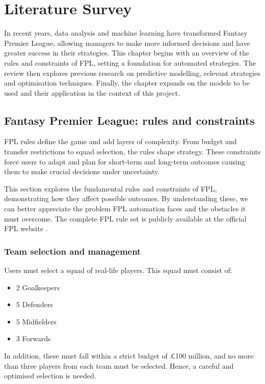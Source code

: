 \chapter{Literature Survey}

In recent years, data analysis and machine learning have transformed Fantasy Premier League, allowing managers to make more informed decisions and have greater success in their strategies.  This chapter begins with an overview of the rules and constraints of FPL, setting a foundation for automated strategies. The review then explores previous research on predictive modelling, relevant strategies and optimisation techniques. Finally, the chapter expands on the models to be used and their application in the context of this project.

\section{Fantasy Premier League: rules and constraints}

FPL rules define the game and add layers of complexity. From budget and transfer restrictions to squad selection, the rules shape strategy. These constraints force users to adapt and plan for short-term and long-term outcomes causing them to make crucial decisions under uncertainty.

This section explores the fundamental rules and constraints of FPL, demonstrating how they affect possible outcomes. By understanding these, we can better appreciate the problem FPL automation faces and the obstacles it must overcome. The complete FPL rule set is publicly available at the official FPL website \cite{fpl}.

\subsection{Team selection and management}

Users must select a squad of real-life players. This squad must consist of:
\begin{itemize}
    \item 2 Goalkeepers
    \item 5 Defenders
    \item 5 Midfielders
    \item 3 Forwards
\end{itemize}

In addition, these must fall within a strict budget of £100 million, and no more than three players from each team must be selected. Hence, a careful and optimised selection is needed.

